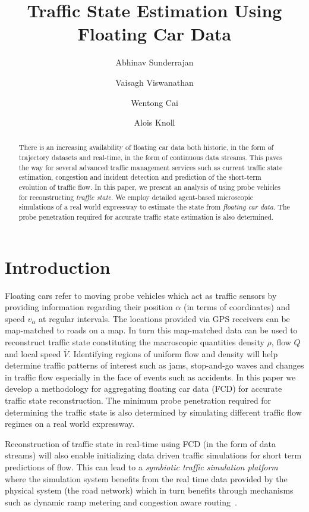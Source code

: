 \documentclass[procedia]{easychair}
\title{Traffic State Estimation Using Floating Car Data}
\author{
    Abhinav Sunderrajan\inst{1}
\and
    Vaisagh Viswanathan\inst{1}
    \and
        Wentong Cai\inst{2}
\and
    Alois Knoll\inst{3}\\
}
\institute{
  TUM CREATE,
  Singapore\\
  \email{abhinav.sunderrajan@tum-create.edu.sg, vaisagh.viswanathan@tum-create.edu.sg}
\and
   Nanyang Technological University,
   Singapore\\
   \email{aswtcai@ntu.edu.sg}\\
\and
   Technische Universit\"at M\"unchen,
   Germany\\
   \email{knoll@in.tum.de}\\
 }
\begin{document}
\maketitle


\begin{abstract}
There is an increasing availability of floating car data both historic, in the form of trajectory datasets and real-time, in the form of continuous data streams. This paves the way for several advanced traffic management services such as current traffic state estimation, congestion and incident detection and prediction of the short-term evolution of traffic flow. In this paper, we present an analysis of using probe vehicles for reconstructing {\it traffic state}. We employ detailed agent-based microscopic simulations of a real world expressway to estimate the state from {\it floating car data}. The probe penetration required for accurate traffic state estimation is also determined.
\end{abstract}



\section{Introduction}
\label{sect:introduction}

 Floating cars refer to moving probe vehicles which act as traffic sensors by providing information regarding their position $\alpha$ (in terms of coordinates) and speed $v_{\alpha}$ at regular intervals. The locations provided via GPS receivers can be map-matched to roads on a map. In turn this map-matched data can be used to reconstruct traffic state constituting the macroscopic quantities density $\rho$, flow $Q$ and local speed $\bar{V}$. Identifying regions of uniform flow and density will help determine traffic patterns of interest such as jams, stop-and-go waves and changes in traffic flow especially in the face of events such as accidents. In this paper we develop a methodology for aggregating floating car data (FCD) for accurate traffic state reconstruction. The minimum probe penetration required for determining the traffic state is also determined by simulating different traffic flow regimes on a real world expressway.
 
 Reconstruction of traffic state in real-time using FCD (in the form of data streams) will also enable initializing data driven traffic simulations for short term predictions of flow. This can lead to a {\it symbiotic traffic simulation platform}~\cite{aydt2012symbiotic} where the simulation system benefits from the real time data provided by the physical system (the road network) which in turn benefits through mechanisms such as dynamic ramp metering and congestion aware routing~\cite{yang2000simulation}. 
 
\end{document}
